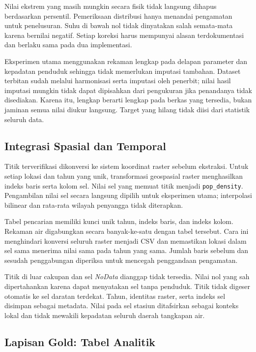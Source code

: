 Nilai ekstrem yang masih mungkin secara fisik tidak langsung dihapus berdasarkan persentil. Pemeriksaan distribusi hanya menandai pengamatan untuk penelusuran. Suhu di bawah nol tidak dinyatakan salah semata-mata karena bernilai negatif. Setiap koreksi harus mempunyai alasan terdokumentasi dan berlaku sama pada dua implementasi.

Eksperimen utama menggunakan rekaman lengkap pada delapan parameter dan kepadatan penduduk sehingga tidak memerlukan imputasi tambahan. Dataset terbitan sudah melalui harmonisasi serta imputasi oleh penerbit; nilai hasil imputasi mungkin tidak dapat dipisahkan dari pengukuran jika penandanya tidak disediakan. Karena itu, lengkap berarti lengkap pada berkas yang tersedia, bukan jaminan semua nilai diukur langsung. Target yang hilang tidak diisi dari statistik seluruh data.

\subsection{Integrasi Spasial dan Temporal}

Titik terverifikasi dikonversi ke sistem koordinat raster sebelum ekstraksi. Untuk setiap lokasi dan tahun yang unik, transformasi geospasial raster menghasilkan indeks baris serta kolom sel. Nilai sel yang memuat titik menjadi \texttt{pop\_density}. Pengambilan nilai sel secara langsung dipilih untuk eksperimen utama; interpolasi bilinear dan rata-rata wilayah penyangga tidak diterapkan.

Tabel pencarian memiliki kunci unik tahun, indeks baris, dan indeks kolom. Rekaman air digabungkan secara banyak-ke-satu dengan tabel tersebut. Cara ini menghindari konversi seluruh raster menjadi CSV dan memastikan lokasi dalam sel sama menerima nilai sama pada tahun yang sama. Jumlah baris sebelum dan sesudah penggabungan diperiksa untuk mencegah penggandaan pengamatan.

Titik di luar cakupan dan sel \textit{NoData} dianggap tidak tersedia. Nilai nol yang sah dipertahankan karena dapat menyatakan sel tanpa penduduk. Titik tidak digeser otomatis ke sel daratan terdekat. Tahun, identitas raster, serta indeks sel disimpan sebagai metadata. Nilai pada sel stasiun ditafsirkan sebagai konteks lokal dan tidak mewakili kepadatan seluruh daerah tangkapan air.

\subsection{Lapisan Gold: Tabel Analitik}

